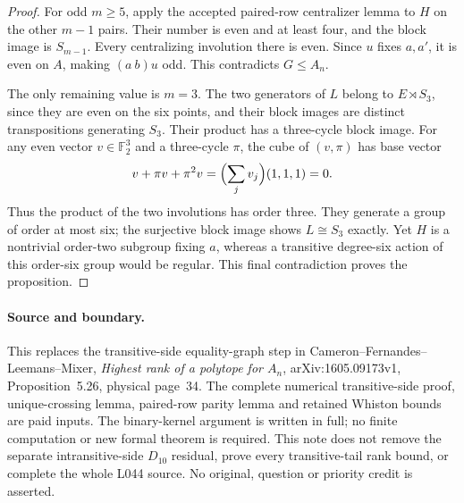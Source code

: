 \documentclass[11pt,a4paper]{article}
\begin{document}
\begin{proof}
For odd $m\geq5$, apply the accepted paired-row centralizer
lemma to $H$ on the other $m-1$ pairs. Their number is even
and at least four, and the block image is $S_{m-1}$.
Every centralizing involution there is even. Since $u$ fixes
$a,a'$, it is even on $A$, making $(a\ b)u$ odd.
This contradicts $G\leq A_n$.

The only remaining value is $m=3$. The two generators of $L$
belong to $E\rtimes S_3$, since they are even on the six
points, and their block images are distinct transpositions
generating $S_3$. Their product has a three-cycle block image.
For any even vector $v\in\mathbb F_2^3$ and a three-cycle
$\pi$, the cube of $(v,\pi)$ has base vector
\[
                   v+\pi v+\pi^2v
                   =\Bigl(\sum_jv_j\Bigr)(1,1,1)=0.
\]
Thus the product of the two involutions has order three.
They generate a group of order at most six; the surjective
block image shows $L\cong S_3$ exactly. Yet $H$ is a
nontrivial order-two subgroup fixing $a$, whereas a transitive
degree-six action of this order-six group would be regular.
This final contradiction proves the proposition.
\end{proof}

\paragraph{Source and boundary.}
This replaces the transitive-side equality-graph step in
Cameron--Fernandes--Leemans--Mixer, \emph{Highest rank of a
polytope for $A_n$}, arXiv:1605.09173v1, Proposition~5.26,
physical page~34. The complete numerical transitive-side
proof, unique-crossing lemma, paired-row parity lemma and
retained Whiston bounds are paid inputs. The binary-kernel
argument is written in full; no finite computation or new
formal theorem is required. This note does not remove the
separate intransitive-side $D_{10}$ residual, prove every
transitive-tail rank bound, or complete the whole L044 source.
No original, question or priority credit is asserted.
\end{document}
